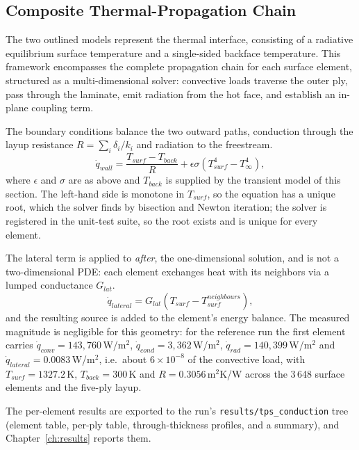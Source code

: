 \subsection{Composite Thermal-Propagation Chain}
\label{sec:thermal_chain}

The two outlined models represent the thermal interface, consisting of a radiative equilibrium surface temperature and a single-sided backface temperature. This framework encompasses the complete propagation chain for each surface element, structured as a multi-dimensional solver: convective loads traverse the outer ply, pass through the laminate, emit radiation from the hot face, and establish an in-plane coupling term.

The boundary conditions balance the two outward paths, conduction through the layup resistance $R=\sum_i \delta_i/k_i$ and radiation to the freestream.
\begin{equation}
    \dot{q}_{wall} = \frac{T_{surf}-T_{back}}{R} + \epsilon\sigma\left(T_{surf}^{4}-T_{\infty}^{4}\right),
    \label{eq:thermal_balance}
\end{equation}
where $\epsilon$ and $\sigma$ are as above and $T_{back}$ is supplied by the transient model of this section. The left-hand side is monotone in $T_{surf}$, so the equation has a unique root, which the solver finds by bisection and Newton iteration; the solver is registered in the unit-test suite, so the root exists and is unique for every element.

The lateral term is applied to \emph{after}, the one-dimensional solution, and is not a two-dimensional PDE: each element exchanges heat with its neighbors via a lumped conductance $G_{lat}$.
\begin{equation}
    \dot{q}_{lateral} = G_{lat}\left(T_{surf}-T_{surf}^{neighbours}\right),
    \label{eq:lateral}
\end{equation}
and the resulting source is added to the element's energy balance. The measured magnitude is negligible for this geometry: for the reference run the first element carries $\dot{q}_{conv}=143{,}760$\,W/m$^2$, $\dot{q}_{cond}=3{,}362$\,W/m$^2$, $\dot{q}_{rad}=140{,}399$\,W/m$^2$ and $\dot{q}_{lateral}=0.0083$\,W/m$^2$, i.e.\ about $6\times10^{-8}$ of the convective load, with $T_{surf}=1327.2$\,K, $T_{back}=300$\,K and $R=0.3056$\,m$^2$K/W across the 3\,648 surface elements and the five-ply layup.

The per-element results are exported to the run's \texttt{results/tps\_conduction} tree (element table, per-ply table, through-thickness profiles, and a summary), and Chapter~\ref{ch:results} reports them.



